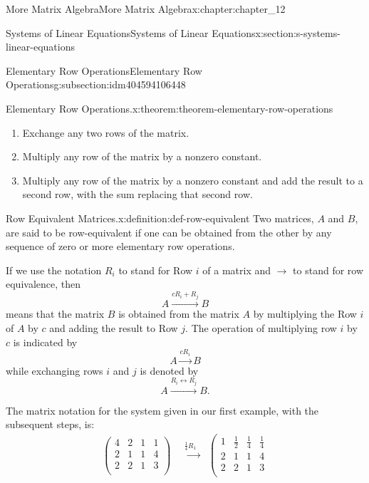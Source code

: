 \documentclass[twoside,10pt,]{book}
\numberwithin{equation}{section}
\begin{document}
\begin{chapterptx}{More Matrix Algebra}{}{More Matrix Algebra}{}{}{x:chapter:chapter_12}
\begin{sectionptx}{Systems of Linear Equations}{}{Systems of Linear Equations}{}{}{x:section:s-systems-linear-equations}
\begin{subsectionptx}{Elementary Row Operations}{}{Elementary Row Operations}{}{}{g:subsection:idm404594106448}
\begin{theorem}{Elementary Row Operations.}{}{x:theorem:theorem-elementary-row-operations}
\begin{enumerate}[label=(\arabic*)]
\item{}Exchange any two rows of the matrix.%
\item{}Multiply any row of the matrix by a nonzero constant.%
\item{}Multiply any row of the matrix by a nonzero constant and add the result to a second row, with the sum replacing that second row.%
\end{enumerate}
%
\end{theorem}
\begin{definition}{Row Equivalent Matrices.}{x:definition:def-row-equivalent}%
%
Two matrices, \(A\) and \(B\), are said to be row-equivalent if one can be obtained from the other by  any sequence of zero or more elementary row operations.%
\end{definition}
If we use the notation \(R_i\) to stand for Row \(i\) of a matrix and \(\longrightarrow\) to stand for row equivalence, then%
\begin{equation*}
A \overset{c R_i+ R_j}{\longrightarrow }B
\end{equation*}
means that the matrix \(B\) is obtained from the matrix \(A\) by multiplying the Row \(i\) of \(A\) by \(c\) and adding the result to Row \(j\).  The operation of multiplying row \(i\) by \(c\) is indicated by%
\begin{equation*}
A \overset{c R_i}{\longrightarrow }B
\end{equation*}
while exchanging rows \(i\) and \(j\) is denoted by%
\begin{equation*}
A \overset{R_i\leftrightarrow R_j}{\longrightarrow }B\text{.}
\end{equation*}
%
\par
The matrix notation for the system given in our first example, with the subsequent steps, is:%
\begin{equation*}
\begin{split}
\left(
\begin{array}{ccc|c}
4 & 2 & 1 & 1 \\
2 & 1 & 1 & 4 \\
2 & 2 & 1 & 3 \\
\end{array}
\right) & \overset{\frac{1}{4} R_1}{\text{  }\longrightarrow }\text{   }\left(
\begin{array}{ccc|c}
1 & \frac{1}{2} & \frac{1}{4} & \frac{1}{4} \\
2 & 1 & 1 & 4 \\
2 & 2 & 1 & 3 \\

\end{array}
\end{split}
\end{equation*}
\end{subsectionptx}
\end{sectionptx}
\end{chapterptx}
\end{document}

